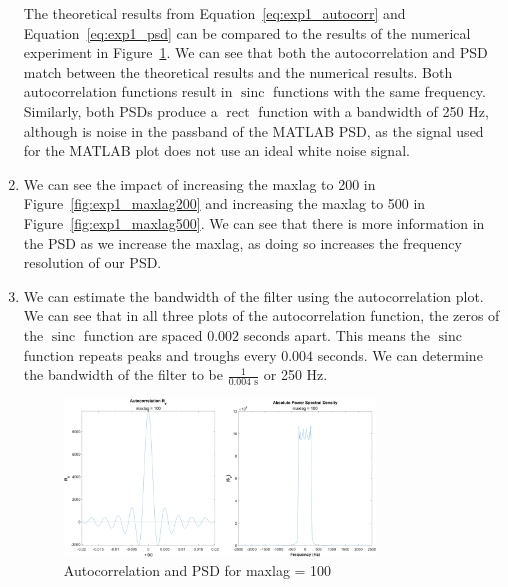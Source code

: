 \documentclass[12pt]{article}
\DeclareMathOperator{\sinc}{sinc}
\DeclareMathOperator{\rect}{rect}
\begin{document}
\begin{enumerate}[label=\roman*)]
	The theoretical results from Equation~\ref{eq:exp1_autocorr} and Equation~\ref{eq:exp1_psd} can be compared to the results of the numerical experiment in Figure~\ref{fig:exp1_maxlag100}. We can see that both the autocorrelation and PSD match between the theoretical results and the numerical results. Both autocorrelation functions result in $\sinc$ functions with the same frequency. Similarly, both PSDs produce a $\rect$ function with a bandwidth of 250 Hz, although is noise in the passband of the MATLAB PSD, as the signal used for the MATLAB plot does not use an ideal white noise signal.

	\item %
	We can see the impact of increasing the maxlag to 200 in Figure~\ref{fig:exp1_maxlag200} and increasing the maxlag to 500 in Figure~\ref{fig:exp1_maxlag500}. We can see that there is more information in the PSD as we increase the maxlag, as doing so increases the frequency resolution of our PSD.

	\item %
	We can estimate the bandwidth of the filter using the autocorrelation plot. We can see that in all three plots of the autocorrelation function, the zeros of the $\sinc$ function are spaced $0.002$ seconds apart. This means the $\sinc$ function repeats peaks and troughs every $0.004$ seconds. We can determine the bandwidth of the filter to be $\frac{1}{0.004\text{ s}}$ or 250 Hz.

	\begin{figure}[h]
		\centering
		\includegraphics[width=0.78\textwidth]{exp1_maxlag_100}
		\caption{\label{fig:exp1_maxlag100}Autocorrelation and PSD for maxlag = 100}
	\end{figure}


\end{enumerate}
\end{document}

